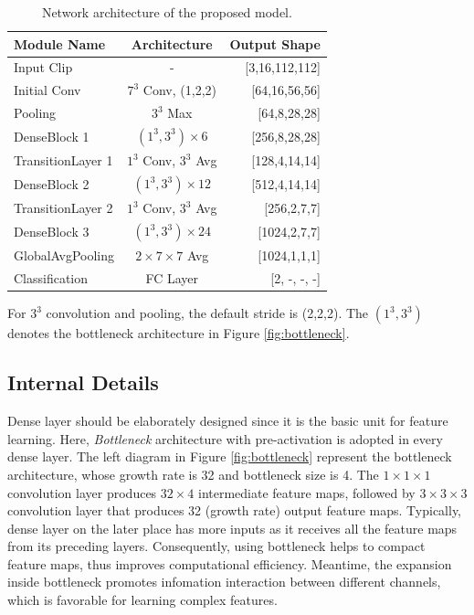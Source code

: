 \documentclass[10pt,twocolumn,letterpaper]{article}
\begin{document}
\begin{table}[b]
\begin{center}
\caption{Network architecture of the proposed model.}
\label{table:arch}
\begin{tabular}{lcr}
\hline
\textbf{Module Name} & \textbf{Architecture} & \textbf{Output Shape} \\
\hline\hline
Input Clip & - & [3,16,112,112] \\
Initial Conv & $7^3$ Conv, (1,2,2) & [64,16,56,56] \\
Pooling & $3^3$ Max & [64,8,28,28] \\
DenseBlock 1 & $(1^3, 3^3) \times 6$ & [256,8,28,28] \\
TransitionLayer 1 & $1^3$ Conv, $3^3$ Avg & [128,4,14,14]\\
DenseBlock 2 & $(1^3, 3^3) \times 12$ & [512,4,14,14] \\
TransitionLayer 2 & $1^3$ Conv, $3^3$ Avg & [256,2,7,7] \\
DenseBlock 3 & $(1^3, 3^3) \times 24$ & [1024,2,7,7]\\
GlobalAvgPooling & $2 \times 7 \times 7$ Avg & [1024,1,1,1]\\
Classification & FC Layer & [2, -, -, -] \\
\hline
\end{tabular}
\end{center}
\footnotesize
For $3^3$ convolution and pooling, the default stride is (2,2,2). The $(1^3, 3^3)$ denotes the bottleneck architecture in Figure \ref{fig:bottleneck}.
\end{table}


\subsection{Internal Details}

Dense layer should be elaborately designed since it is the basic unit for feature learning. 
Here, \emph{Bottleneck} architecture with pre-activation is adopted in every dense layer. 
The left diagram in Figure \ref{fig:bottleneck} represent the bottleneck architecture, whose growth rate is 32 and bottleneck size is 4.
The $1 \times 1 \times 1$ convolution layer produces $32 \times 4$ intermediate feature maps, followed by $3 \times 3 \times 3$ convolution layer that produces 32 (growth rate) output feature maps.
Typically, dense layer on the later place has more inputs as it receives all the feature maps from its preceding layers. 
Consequently, using bottleneck helps to compact feature maps, thus improves computational efficiency.
Meantime, the expansion inside bottleneck promotes infomation interaction between different channels, which is favorable for learning complex features.
\end{document}
